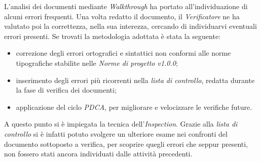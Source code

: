 L’analisi dei documenti mediante \textit{Walkthrough}\glo{} ha portato all’individuazione di alcuni errori frequenti. 
Una volta redatto il documento, il \textit{Verificatore} ne ha valutato poi la correttezza, nella sua interezza, cercando di individuarvi eventuali errori presenti. 
Se trovati la metodologia adottata è stata la seguente:
\begin{itemize}
    \item correzione degli errori ortografici e sintattici non conformi alle norme tipografiche stabilite nelle \textit{Norme di progetto v1.0.0};
    \item inserimento degli errori più ricorrenti nella \textit{lista di controllo}\glo{}, redatta durante la fase di verifica dei documenti;
    \item applicazione del ciclo \textit{PDCA}\glo{}, per migliorare e velocizzare le verifiche future. 
\end{itemize} 

A questo punto si è impiegata la tecnica dell'\textit{Inspection}\glo{}. 
Grazie alla \textit{lista di controllo}\glo{} si è infatti potuto svolgere un ulteriore esame nei confronti del documento sottoposto a verifica, per scoprire quegli errori che seppur presenti, non fossero stati ancora individuati dalle attività precedenti.
